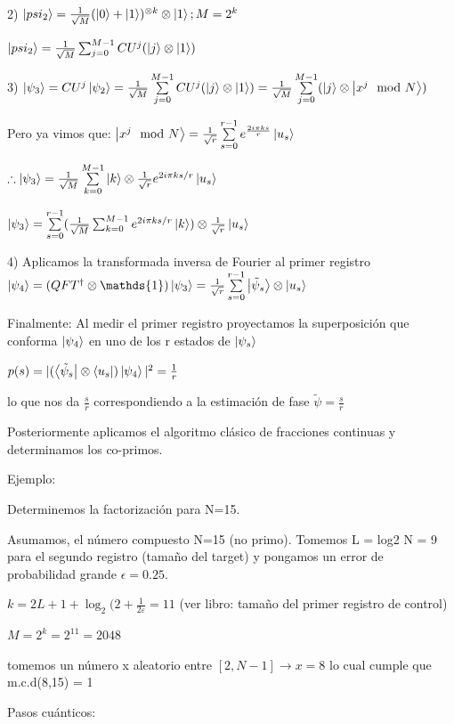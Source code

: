 2) $\ket{psi_2} = \frac{1}{\sqrt{M}} (\ket{0} + \ket{1})^{\otimes k} \otimes \ket{1}; M=2^k$

$\ket{psi_2} = \frac{1}{\sqrt{M}} \sum_{j=0}^{M-1} CU^j (\ket{j} \otimes \ket{1})$

3) $\ket{\psi_3} = CU^j \ket{\psi_2} = \frac{1}{\sqrt{M}} \sum\limits_{j=0}^{M-1} CU^j (\ket{j} \otimes \ket{1}) = \frac{1}{\sqrt{M}} \sum\limits_{j=0}^{M-1} (\ket{j} \otimes \ket{x^j \mod N})$

Pero ya vimos que: $\ket{x^j \mod N} = \frac{1}{\sqrt{r}} \sum\limits_{s=0}^{r-1} e^{\frac{2 i \pi k s}{r}} \ket{u_s}$

$\therefore \ket{\psi_3} = \frac{1}{\sqrt{M}} \sum\limits_{k=0}^{M-1} \ket{k} \otimes \frac{1}{\sqrt{r}} e^{2 i \pi k s/r} \ket{u_s}$

$\ket{\psi_3} = \sum\limits_{s=0}^{r-1} (\frac{1}{\sqrt{M}} \sum_{k=0}^{M-1} e^{2 i \pi k s/r} \ket{k}) \otimes \frac{1}{\sqrt{r}} \ket{u_s}$

4) Aplicamos la transformada inversa de Fourier al primer registro $\ket{\psi_4} = (QFT^\dagger \otimes \mathds{1}) \ket{\psi_3} = \frac{1}{\sqrt{r}} \sum\limits_{s=0}^{r-1} \ket{\tilde{\psi}_s} \otimes \ket{u_s}$

Finalmente: Al medir el primer registro proyectamos la superposición que conforma $\ket{\psi_4}$ en uno de los r estados de $\ket{\psi_s}$

$p(s) = |(\bra{\tilde{\psi}_s} \otimes \bra{u_s}) \ket{\psi_4}|^2 = \frac{1}{r}$

lo que nos da $\frac{s}{r}$ correspondiendo a la estimación de fase $\tilde{\psi} = \frac{s}{r}$

Posteriormente aplicamos el algoritmo clásico de fracciones continuas y determinamos los co-primos.

Ejemplo:

Determinemos la factorización para N=15.

Asumamos, el número compuesto N=15 (no primo). Tomemos L = log2 N = 9 para el segundo registro (tamaño del target) y pongamos un error de probabilidad grande $\epsilon = 0.25$.

$k = 2L + 1 + \log_2(2 + \frac{1}{2 \varepsilon} = 11$ (ver libro: tamaño del primer registro de control)

$M = 2^k = 2^{11} = 2048$

tomemos un número x aleatorio entre $[2, N-1] \rightarrow x = 8$ lo cual cumple que m.c.d(8,15) = 1

Pasos cuánticos:

